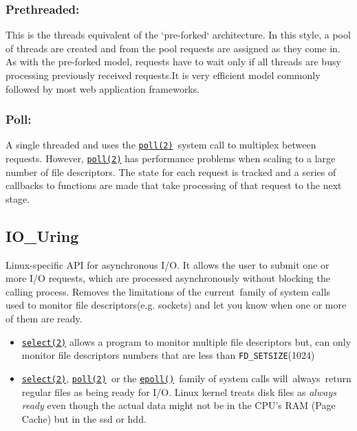 \documentclass[
	a4paper,
	10pt,
	unnumberedsections,
	twoside, 
]{LTJournalArticle}
\begin{document}
\subsubsection{Prethreaded:}
This is the threads equivalent of the `pre-forked` architecture. In this style, a pool of threads are created and from the pool requests are assigned as they come in. As with the pre-forked model, requests have to wait only if all threads are busy processing previously received requests.It is very efficient model commonly followed by most web application frameworks.

\subsubsection{Poll:}
A single threaded and uses the \href{http://man7.org/linux/man-pages/man2/poll.2.html}{\texttt{poll(2)}} system call to multiplex between requests. However, \href{http://man7.org/linux/man-pages/man2/poll.2.html}{\texttt{poll(2)}} has performance problems when scaling to a large number of file descriptors. The state for each request is tracked and a series of callbacks to functions are made that take processing of that request to the next stage.

\subsection{IO\_Uring}
\label{sec:io_uring}
Linux-specific API for asynchronous I/O. It allows the user to submit one or more I/O requests, which are processed asynchronously without blocking the calling process.
Removes the limitations of the current family of system calls used to monitor file descriptors(e.g. sockets) and let you know when one or more of them are ready.
\begin{itemize}
	\item \href{http://man7.org/linux/man-pages/man2/select.2.html}{\texttt{select(2)}} allows a program to monitor multiple file descriptors but, can only monitor file descriptors numbers that are less than \texttt{FD\_SETSIZE}(1024)
	\item  \href{http://man7.org/linux/man-pages/man2/select.2.html}{\texttt{select(2)}}, \href{http://man7.org/linux/man-pages/man2/poll.2.html}{\texttt{poll(2)}} or the \href{http://man7.org/linux/man-pages/man7/select.7.html}{\texttt{epoll()}} family of system calls will always return regular files as being ready for I/O. Linux kernel treats disk files as \textit{always ready} even though the actual data might not be in the CPU's RAM (Page Cache) but in the ssd or hdd.
\end{itemize}
\end{document}
